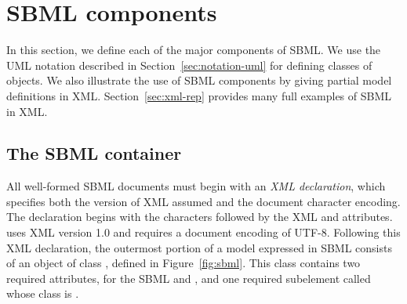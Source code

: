 
\section{SBML components}
\label{sec:elements}

In this section, we define each of the major components of SBML.
We use the UML notation described in
Section~\ref{sec:notation-uml} for defining classes of objects.
We also illustrate the use of SBML components by giving partial
model definitions in XML.  Section~\ref{sec:xml-rep} provides many
full examples of SBML in XML.


\subsection{The SBML container}
\label{sec:sbml}

All well-formed SBML documents must begin with an \emph{XML
  declaration}, which specifies both the version of XML assumed
and the document character encoding.  The declaration begins with
the characters  followed by the XML 
and  attributes.  \sbmltwo uses XML version 1.0
and requires a document encoding of UTF-8.  Following this XML
declaration, the outermost portion of a model expressed in SBML
\thisLV consists of an object of class \Sbml, defined in
Figure~\ref{fig:sbml}.  This class contains two required
attributes, for the SBML  and , and
one required subelement called  whose class is
\Model.

